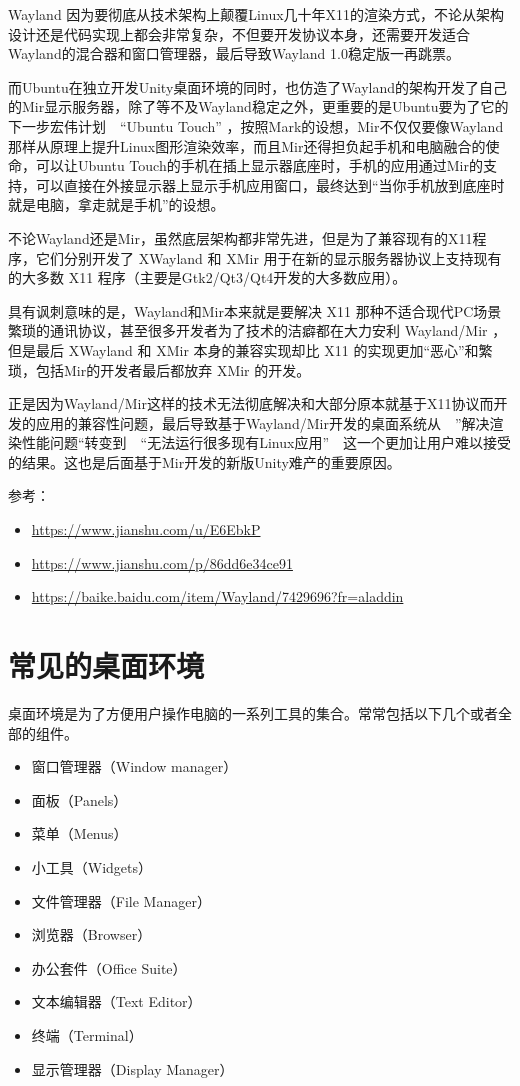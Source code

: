 \documentclass[doctor,openright,twoside]{sjtuthesis}
\providecommand{\tightlist}{%
    \setlength{\itemsep}{0pt}\setlength{\parskip}{0pt}}
\theoremstyle{plain}
\theoremstyle{definition}
\theoremstyle{remark}
\theoremstyle{ocrenumbox}
\theoremstyle{plain}
\newcommand\cqh{“}
\newcommand\cqt{”}
\begin{document}
Wayland
因为要彻底从技术架构上颠覆Linux几十年X11的渲染方式，不论从架构设计还是代码实现上都会非常复杂，不但要开发协议本身，还需要开发适合Wayland的混合器和窗口管理器，最后导致Wayland
1.0稳定版一再跳票。

而Ubuntu在独立开发Unity桌面环境的同时，也仿造了Wayland的架构开发了自己的Mir显示服务器，除了等不及Wayland稳定之外，更重要的是Ubuntu要为了它的下一步宏伟计划　``Ubuntu
Touch''
，按照Mark的设想，Mir不仅仅要像Wayland那样从原理上提升Linux图形渲染效率，而且Mir还得担负起手机和电脑融合的使命，可以让Ubuntu
Touch的手机在插上显示器底座时，手机的应用通过Mir的支持，可以直接在外接显示器上显示手机应用窗口，最终达到\cqh 当你手机放到底座时就是电脑，拿走就是手机\cqt 的设想。

不论Wayland还是Mir，虽然底层架构都非常先进，但是为了兼容现有的X11程序，它们分别开发了
XWayland 和 XMir 用于在新的显示服务器协议上支持现有的大多数 X11
程序（主要是Gtk2/Qt3/Qt4开发的大多数应用）。

具有讽刺意味的是，Wayland和Mir本来就是要解决 X11
那种不适合现代PC场景繁琐的通讯协议，甚至很多开发者为了技术的洁癖都在大力安利
Wayland/Mir ，但是最后 XWayland 和 XMir 本身的兼容实现却比 X11
的实现更加\cqh 恶心\cqt 和繁琐，包括Mir的开发者最后都放弃 XMir 的开发。

正是因为Wayland/Mir这样的技术无法彻底解决和大部分原本就基于X11协议而开发的应用的兼容性问题，最后导致基于Wayland/Mir开发的桌面系统从　\cqt 解决渲染性能问题\cqh  转变到　\cqh 无法运行很多现有Linux应用\cqt 　这一个更加让用户难以接受的结果。这也是后面基于Mir开发的新版Unity难产的重要原因。

参考：

\begin{itemize}
\tightlist
\item
  \url{https://www.jianshu.com/u/E6EbkP}
\item
  \url{https://www.jianshu.com/p/86dd6e34ce91}
\item
  \url{https://baike.baidu.com/item/Wayland/7429696?fr=aladdin}
\end{itemize}

\section{常见的桌面环境}

桌面环境是为了方便用户操作电脑的一系列工具的集合。常常包括以下几个或者全部的组件。

\begin{itemize}
\tightlist
\item
  窗口管理器（Window manager）
\item
  面板（Panels）
\item
  菜单（Menus）
\item
  小工具（Widgets）
\item
  文件管理器（File Manager）
\item
  浏览器（Browser）
\item
  办公套件（Office Suite）
\item
  文本编辑器（Text Editor）
\item
  终端（Terminal）
\item
  显示管理器（Display Manager）
\end{itemize}
\end{document}
